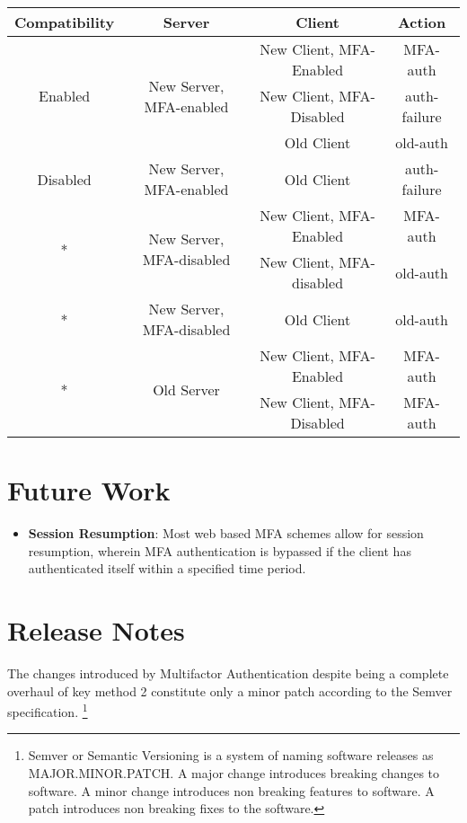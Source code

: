 \documentclass[11pt,oneside]{book}
\begin{document}
{
    \centering
\begin{tabular}{|c|c|c|c|}
    \hline
    \textbf{Compatibility} & \textbf{Server} & \textbf{Client} & \textbf{Action} \\
    \hline
    \multirow{3}{*}{Enabled} & \multirow{3}{*}{New Server, MFA-enabled} & New Client, MFA-Enabled & MFA-auth\\
                             & & New Client, MFA-Disabled & auth-failure\\
                             & & Old Client & old-auth\\
    \hline
    Disabled & New Server, MFA-enabled & Old Client & auth-failure\\
    \hline
    \multirow{2}{*}{*} & \multirow{2}{*}{New Server, MFA-disabled} & New Client, MFA-Enabled & MFA-auth\\
                       & & New Client, MFA-disabled & old-auth\\
    \hline
    * & New Server, MFA-disabled & Old Client & old-auth\\
    \hline
    \multirow{2}{*}{*} & \multirow{2}{*}{Old Server} & New Client, MFA-Enabled & MFA-auth\\
                       & & New Client, MFA-Disabled & MFA-auth\\
    \hline
\end{tabular}
}

\section{Future Work}
\begin{itemize}
    \item \textbf{Session Resumption}: Most web based MFA schemes allow for session resumption,
        wherein MFA authentication is bypassed if the client has authenticated itself within
        a specified time period.
\end{itemize}

\section{Release Notes}
The changes introduced by Multifactor Authentication despite being a complete overhaul of key method
2 constitute only a minor patch according to the Semver specification. \footnote{Semver or Semantic
Versioning is a system of naming software releases as MAJOR.MINOR.PATCH. A major change introduces
breaking changes to software. A minor change introduces non breaking features to software.
A patch introduces non breaking fixes to the software.}
\end{document}
